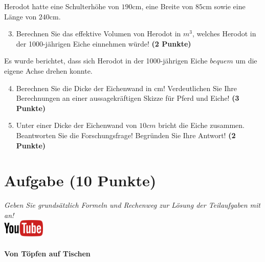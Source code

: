 \documentclass[a4paper, 10pt]{scrartcl}\usepackage[]{graphicx}\usepackage[]{xcolor}
\begin{document}
Herodot hatte eine Schulterh{\"o}he von $190$cm, eine Breite von
$85$cm sowie eine L{\"a}nge von  $240$cm.

\begin{enumerate}
  \setcounter{enumi}{2}
\item Berechnen Sie das effektive Volumen von Herodot in $m^3$, welches
  Herodot in der 1000-j{\"a}hrigen Eiche einnehmen w{\"u}rde! \textbf{(2 Punkte)}
\end{enumerate}

Es wurde berichtet, dass sich Herodot in der 1000-j{\"a}hrigen Eiche
$bequem$ um die eigene Achse drehen konnte.

\begin{enumerate}
  \setcounter{enumi}{3}
\item Berechnen Sie die Dicke der Eichenwand in cm! Verdeutlichen Sie Ihre
  Berechnungen an einer aussagekr{\"a}ftigen Skizze f{\"u}r Pferd und Eiche! \textbf{(3 Punkte)} 
\item Unter einer Dicke der Eichenwand von $10cm$ bricht
  die Eiche zusammen. Beantworten Sie die Forschungsfrage! Begr{\"u}nden Sie
  Ihre Antwort! \textbf{(2 Punkte)} 
\end{enumerate}

\clearpage\null 
\clearpage

\section{Aufgabe \hfill (10 Punkte)}

\textit{Geben Sie grunds{\"a}tzlich Formeln und Rechenweg zur L{\"o}sung der
  Teilaufgaben mit an!} \\[1Ex]

\hfill\href{https://youtu.be/57B-yYoFSk0}{\includegraphics[width =
  2cm]{img/youtube}} %
\hspace{2Ex}

\paragraph{Von T{\"o}pfen auf Tischen}
\end{document}
